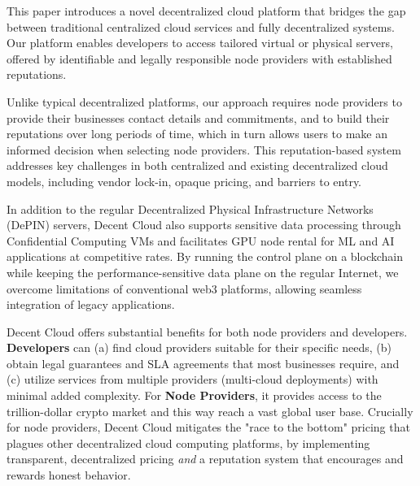 This paper introduces a novel decentralized cloud platform that bridges the gap between traditional centralized cloud services and fully decentralized systems. Our platform enables developers to access tailored virtual or physical servers, offered by identifiable and legally responsible node providers with established reputations.

Unlike typical decentralized platforms, our approach requires node providers to provide their businesses contact details and commitments, and to build their reputations over long periods of time, which in turn allows users to make an informed decision when selecting node providers. This reputation-based system addresses key challenges in both centralized and existing decentralized cloud models, including vendor lock-in, opaque pricing, and barriers to entry.

In addition to the regular Decentralized Physical Infrastructure Networks (DePIN) servers, Decent Cloud also supports sensitive data processing through Confidential Computing VMs and facilitates GPU node rental for ML and AI applications at competitive rates. By running the control plane on a blockchain while keeping the performance-sensitive data plane on the regular Internet, we overcome limitations of conventional web3 platforms, allowing seamless integration of legacy applications.

Decent Cloud offers substantial benefits for both node providers and developers. {\bf Developers} can (a) find cloud providers suitable for their specific needs, (b) obtain legal guarantees and SLA agreements that most  businesses require, and (c) utilize services from multiple providers (multi-cloud deployments) with minimal added complexity. For {\bf Node Providers}, it provides access to the trillion-dollar crypto market and this way reach a vast global user base. Crucially for node providers, Decent Cloud mitigates the "race to the bottom" pricing that plagues other decentralized cloud computing platforms, by implementing transparent, decentralized pricing {\em and} a reputation system that encourages and rewards honest behavior.
